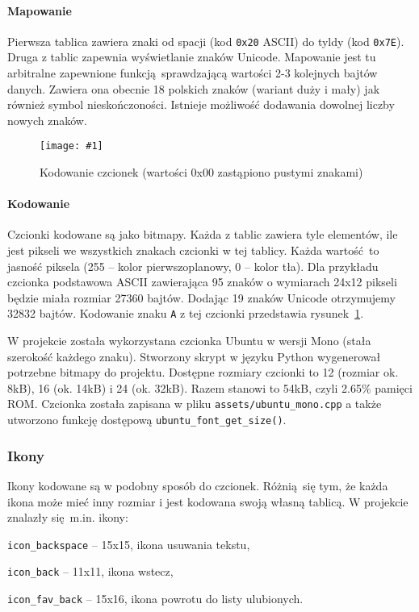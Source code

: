 \documentclass[12pt]{report}
\let\tempone\itemize
\let\temptwo\enditemize
\renewenvironment{itemize}{\tempone\setlength{\itemsep}{0cm}}{\temptwo}
\newcommand{\imgint}[4]{
	\begin{figure}[{#4}]
		\centering
		\texttt{[image: \#1]}
		\caption{#2}
		\label{#1}
	\end{figure}
}
\newcommand{\imgh}[3]{\imgint{#1}{#2}{#3}{H}}
\begin{document}
				\paragraph{Mapowanie}
					Pierwsza tablica zawiera znaki od spacji (kod \lstinline|0x20| ASCII) do tyldy (kod \lstinline|0x7E|). Druga z tablic zapewnia wyświetlanie znaków Unicode. Mapowanie jest tu arbitralne zapewnione funkcją sprawdzającą wartości 2-3 kolejnych bajtów danych. Zawiera ona obecnie 18 polskich znaków (wariant duży i mały) jak również symbol nieskończoności. Istnieje możliwość dodawania dowolnej liczby nowych znaków.
				
				\imgh{3/PicoRadio-screen-font}{Kodowanie czcionek (wartości 0x00 zastąpiono pustymi znakami)}{0.6}
				\paragraph{Kodowanie}
					Czcionki kodowane są jako bitmapy. Każda z tablic zawiera tyle elementów, ile jest pikseli we wszystkich znakach czcionki w tej tablicy. Każda wartość to jasność piksela (255 -- kolor pierwszoplanowy, 0 -- kolor tła). Dla przykładu czcionka podstawowa ASCII zawierająca 95 znaków o wymiarach 24x12 pikseli będzie miała rozmiar 27360 bajtów. Dodając 19 znaków Unicode otrzymujemy 32832 bajtów. Kodowanie znaku \lstinline|A| z tej czcionki przedstawia rysunek~\ref{3/PicoRadio-screen-font}.
				
				$ $\\
				W projekcie została wykorzystana czcionka Ubuntu\textsuperscript{\cite{ubuntu_font}} w wersji Mono (stała szerokość każdego znaku). Stworzony skrypt w języku Python wygenerował potrzebne bitmapy do projektu. Dostępne rozmiary czcionki to 12 (rozmiar ok. 8kB), 16 (ok. 14kB) i 24 (ok. 32kB). Razem stanowi to 54kB, czyli 2.65\% pamięci ROM. Czcionka została zapisana w pliku \lstinline|assets/ubuntu_mono.cpp| a także utworzono funkcję dostępową \lstinline|ubuntu_font_get_size()|. 
				
			\subsubsection{Ikony}
				Ikony kodowane są w podobny sposób do czcionek. Różnią się tym, że każda ikona może mieć inny rozmiar i jest kodowana swoją własną tablicą. W projekcie znalazły się m.in. ikony:
				\begin{itemize}
					\item \lstinline|icon_backspace| -- 15x15, ikona usuwania tekstu,
					\item \lstinline|icon_back| -- 11x11, ikona wstecz,
					\item \lstinline|icon_fav_back| -- 15x16, ikona powrotu do listy ulubionych.
				\end{itemize}
		
\end{document}
